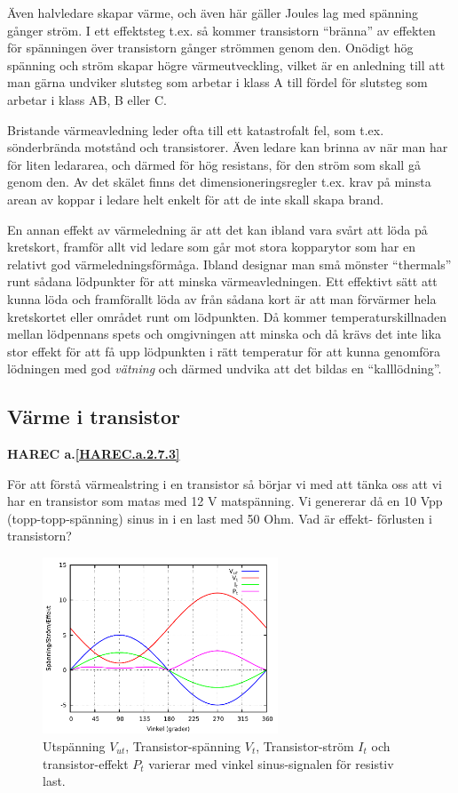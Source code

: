 Även halvledare skapar värme, och även här gäller Joules lag med spänning
gånger ström. I ett effektsteg t.ex. så kommer transistorn ``bränna'' av
effekten för spänningen över transistorn gånger strömmen genom den. Onödigt
hög spänning och ström skapar högre värmeutveckling, vilket är en anledning
till att man gärna undviker slutsteg som arbetar i klass A till fördel för
slutsteg som arbetar i klass AB, B eller C.

Bristande värmeavledning leder ofta till ett katastrofalt fel, som t.ex.
sönderbrända motstånd och transistorer. Även ledare kan brinna av när man
har för liten ledararea, och därmed för hög resistans, för den ström som
skall gå genom den. Av det skälet finns det dimensioneringsregler t.ex.
krav på minsta arean av koppar i ledare helt enkelt för att de inte skall
skapa brand.

En annan effekt av värmeledning är att det kan ibland vara svårt att löda
på kretskort, framför allt  vid ledare som går mot stora kopparytor som
har en relativt god värmeledningsförmåga. Ibland designar man små mönster
``thermals'' runt sådana lödpunkter för att minska värmeavledningen.
Ett effektivt sätt att kunna löda och framförallt löda av från sådana
kort är att man förvärmer hela kretskortet eller området runt om
lödpunkten. Då kommer temperaturskillnaden mellan lödpennans spets och
omgivningen att minska och då krävs det inte lika stor effekt för att få
upp lödpunkten i rätt temperatur för att kunna genomföra lödningen med god
\emph{vätning} och därmed undvika att det bildas en ``kalllödning''.

\subsection{Värme i transistor}
\textbf{
HAREC a.\ref{HAREC.a.2.7.3}\label{myHAREC.a.2.7.3}
}

För att förstå värmealstring i en transistor så börjar vi med att tänka oss
att vi har en transistor som matas med 12 V matspänning. Vi genererar då en
10 Vpp (topp-topp-spänning) sinus in i en last med 50 Ohm. Vad är effekt-
förlusten i transistorn?

\begin{figure}[h]
\begin{center}
\includegraphics[width=7cm]{images/power1}
\caption{Utspänning $V_{ut}$, Transistor-spänning $V_t$, Transistor-ström $I_t$ och transistor-effekt $P_t$ varierar med vinkel sinus-signalen för resistiv last.}
\label{fig:power1}
\end{center}
\end{figure}

